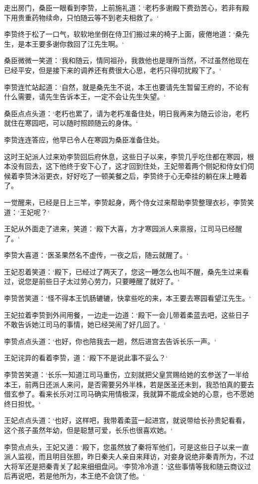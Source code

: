 走出房门，桑臣一眼看到李贽，上前施礼道：‘老朽多谢殿下费劲苦心，若非有殿下用贵重药物续命，只怕随云等不到老夫相救了。‘

李贽终于松了一口气，软软地坐倒在侍卫们搬过来的椅子上面，疲倦地道：‘桑先生，是本王要多谢你救回了江先生啊。‘

桑臣微微一笑道：‘我和随云，情同祖孙，我救他也是理所当然，不过虽然他现在已经平安，但是接下来的调养还有费很大心思，老朽只得叨扰殿下了。‘

李贽连忙站起道：‘自然，就是桑先生不说，本王也要请先生暂留王府的，不论有什么需要，请先生告诉本王，一定不会让先生失望。‘

桑臣点点头道：‘老朽也累了，请为老朽准备住处，明日我再来为随云诊治，老朽就住在寒园吧，可以随时照顾随云的身体。‘

李贽连连答应，他早已令人在寒园为桑臣准备住处。

这时王妃派人过来劝李贽回后府休息，这些日子以来，李贽几乎吃住都在寒园，根本没有回去，这下他终于安下心了，这才回到住处，王妃带着两个侧妃和侍女们伺候着李贽沐浴更衣，好好吃了一顿美餐之后，李贽终于心无牵挂的躺在床上睡着了。

一觉醒来，已经是日上三竿，李贽起身，两个侍女过来帮助李贽整理衣衫，李贽笑道：‘王妃呢？‘

王妃从外面走了进来，笑道：‘殿下大喜，方才寒园派人来禀报，江司马已经醒了。‘

李贽大喜道：‘医圣果然名不虚传，一夜之后，随云就醒了。‘

王妃忍着笑道：‘殿下，已经过了两天了，您这一睡怎么也叫不醒，桑先生过来看过，说您是前些日子太过劳心劳力，只要睡醒了就好了。‘

李贽苦笑道：‘怪不得本王饥肠辘辘，快拿些吃的来，本王要去寒园看望江先生。‘

王妃拉着李贽到外间用餐，一边走一边道：‘殿下一会儿带着柔蓝去吧，这些日子不敢告诉她江司马的事情，她已经哭闹了好几回了。‘

李贽点点头道：‘也好，你也陪我去一趟，然后进宫去告诉长乐一声。‘

王妃诧异的看着李贽，道：‘殿下不是说此事不妥么？‘

李贽苦笑道：‘长乐一知道江司马重伤，立刻就把父皇赏赐给她的玄参送了一半给本王，前两日还派人来问，是否需要另外半株，若是医圣还未到，我恐怕真的要去借玄参了。看来长乐对江司马确实用情极深，我就算不能成全她的心意，也不愿她终日担忧。‘

王妃点点头道：‘也好，这样吧，我带着柔蓝一起进宫，就说带给长孙贵妃看看，这个孩子虽然年幼，但是聪慧可爱，长乐也很喜欢她。‘

李贽点点头，王妃又道：‘殿下，您虽然放了秦将军他们，可是这些日子以来一直派人监视，而且明目张胆，昨日秦夫人亲自来拜访，对妾身说绝非秦青所为，不过大将军还是把秦青关了起来细细盘问。‘李贽冷冷道：‘这些事情等我和随云商议过后再说吧，若是他所为，本王绝不会饶了他。‘

